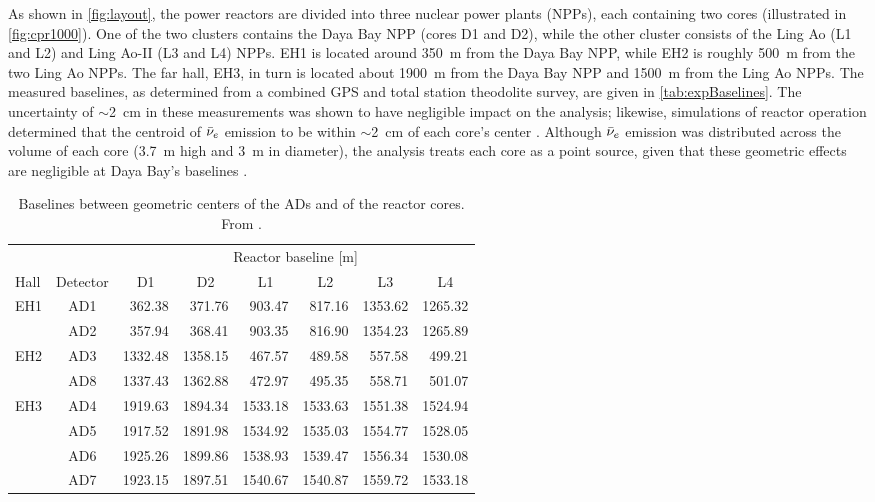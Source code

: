 \documentclass[../thesis.tex]{subfiles}
\begin{document}
As shown in \autoref{fig:layout}, the power reactors are divided into three nuclear power plants (NPPs), each containing two cores (illustrated in \autoref{fig:cpr1000}). One of the two clusters contains the Daya Bay NPP (cores D1 and D2), while the other cluster consists of the Ling Ao (L1 and L2) and Ling Ao-II (L3 and L4) NPPs. EH1 is located around 350~m from the Daya Bay NPP, while EH2 is roughly 500~m from the two Ling Ao NPPs. The far hall, EH3, in turn is located about 1900~m from the Daya Bay NPP and 1500~m from the Ling Ao NPPs. The measured baselines, as determined from a combined GPS and total station theodolite survey, are given in \autoref{tab:expBaselines}. The uncertainty of $\sim$2~cm in these measurements was shown to have negligible impact on the analysis; likewise, simulations of reactor operation determined that the centroid of $\bar\nu_e$ emission to be within $\sim$2~cm of each core's center \cite{An_2017}. Although $\bar\nu_e$ emission was distributed across the volume of each core (3.7~m high and 3~m in diameter), the analysis treats each core as a point source, given that these geometric effects are negligible at Daya Bay's baselines \cite{An_2017}.

\begin{table}[ht]
  \begin{tabular}{lcrrrrrr}
    \toprule
    \multicolumn{2}{c}{} & \multicolumn{6}{c}{Reactor baseline [m]} \\
    \cmidrule{3-8}
    Hall & Detector & \multicolumn{1}{c}{D1} & \multicolumn{1}{c}{D2} & \multicolumn{1}{c}{L1} & \multicolumn{1}{c}{L2} & \multicolumn{1}{c}{L3} & \multicolumn{1}{c}{L4} \\
    \midrule
    EH1  & AD1      & 362.38  & 371.76  & 903.47  & 817.16  & 1353.62 & 1265.32 \\
         & AD2      & 357.94  & 368.41  & 903.35  & 816.90  & 1354.23 & 1265.89 \\
    EH2  & AD3      & 1332.48 & 1358.15 & 467.57  & 489.58  & 557.58  & 499.21  \\
         & AD8      & 1337.43 & 1362.88 & 472.97  & 495.35  & 558.71  & 501.07  \\
    EH3  & AD4      & 1919.63 & 1894.34 & 1533.18 & 1533.63 & 1551.38 & 1524.94 \\
         & AD5      & 1917.52 & 1891.98 & 1534.92 & 1535.03 & 1554.77 & 1528.05 \\
         & AD6      & 1925.26 & 1899.86 & 1538.93 & 1539.47 & 1556.34 & 1530.08 \\
         & AD7      & 1923.15 & 1897.51 & 1540.67 & 1540.87 & 1559.72 & 1533.18 \\
    \bottomrule
  \end{tabular}
  \caption{Baselines between geometric centers of the ADs and of the reactor cores. From \cite{An_2017}.}
  \label{tab:expBaselines}
\end{table}
\end{document}
